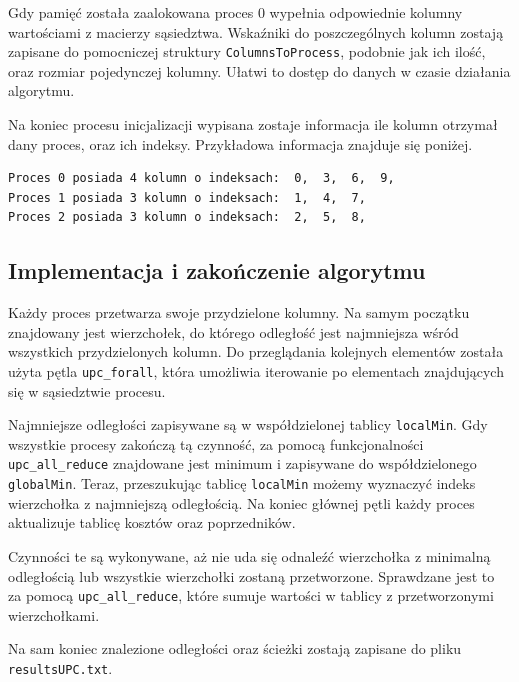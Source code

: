 \documentclass[12pt]{article}
\begin{document}
Gdy pamięć została zaalokowana proces 0 wypełnia odpowiednie kolumny wartościami z macierzy sąsiedztwa. Wskaźniki do poszczególnych kolumn zostają zapisane do pomocniczej struktury \lstinline{ColumnsToProcess}, podobnie jak ich ilość, oraz rozmiar pojedynczej kolumny. Ułatwi to dostęp do danych w czasie działania algorytmu.

Na koniec procesu inicjalizacji wypisana zostaje informacja ile kolumn otrzymał dany proces, oraz ich indeksy. Przykładowa informacja znajduje się poniżej.

\begin{lstlisting}
Proces 0 posiada 4 kolumn o indeksach:  0,  3,  6,  9,
Proces 1 posiada 3 kolumn o indeksach:  1,  4,  7,
Proces 2 posiada 3 kolumn o indeksach:  2,  5,  8,
\end{lstlisting}

\subsection{Implementacja i zakończenie algorytmu}
Każdy proces przetwarza swoje przydzielone kolumny. Na samym początku znajdowany jest wierzchołek, do którego odległość jest najmniejsza wśród wszystkich przydzielonych kolumn. Do przeglądania kolejnych elementów została użyta pętla \lstinline{upc_forall}, która umożliwia iterowanie po elementach znajdujących się w sąsiedztwie procesu.

 Najmniejsze odległości zapisywane są w współdzielonej tablicy \lstinline{localMin}. Gdy wszystkie procesy zakończą tą czynność, za pomocą funkcjonalności \lstinline{upc_all_reduce} znajdowane jest minimum i zapisywane do współdzielonego \lstinline{globalMin}. Teraz, przeszukując tablicę \lstinline{localMin} możemy wyznaczyć indeks wierzchołka z najmniejszą odległością. Na koniec głównej pętli każdy proces aktualizuje tablicę kosztów oraz poprzedników.

Czynności te są wykonywane, aż nie uda się odnaleźć wierzchołka z minimalną odległością lub wszystkie wierzchołki zostaną przetworzone. Sprawdzane jest to za pomocą \lstinline{upc_all_reduce}, które sumuje wartości w tablicy z przetworzonymi wierzchołkami.

Na sam koniec znalezione odległości oraz ścieżki zostają zapisane do pliku \lstinline{resultsUPC.txt}.
\end{document}
